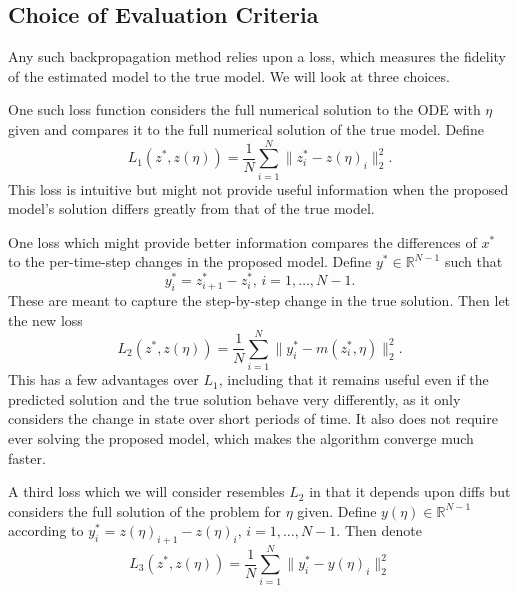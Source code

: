 \documentclass[12pt]{article}
\begin{document}
\subsection{Choice of Evaluation Criteria}\label{norms}

Any such backpropagation method relies upon a loss, which measures the fidelity of the estimated model to the true model. We will look at three choices.

One such loss function considers the full numerical solution to the ODE with $\eta$ given and compares it to the full numerical solution of the true model. Define $$ L_1(z^*, z(\eta)) = \frac{1}{N} \sum_{i=1}^N \|z_i^* - z(\eta)_i\|_2^2.$$ This loss is intuitive but might not provide useful information when the proposed model's solution differs greatly from that of the true model.

One loss which might provide better information compares the differences of $x^*$ to the per-time-step changes in the proposed model. Define $y^* \in \mathbb{R}^{N-1}$ such that $$ y^*_i = z^*_{i+1} - z^*_i,\, i = 1, \ldots , N-1. $$  These are meant to capture the step-by-step change in the true solution. Then let the new loss $$ L_2(z^*, z(\eta)) = \frac{1}{N} \sum_{i=1}^N \| y^*_i - m(z_i^*, \eta) \|^2_2. $$ This has a few advantages over $L_1$, including that it remains useful even if the predicted solution and the true solution behave very differently, as it only considers the change in state over short periods of time. It also does not require ever solving the proposed model, which makes the algorithm converge much faster.

A third loss which we will consider resembles $L_2$ in that it depends upon diffs but considers the full solution of the problem for $\eta$ given. Define $y(\eta) \in \mathbb{R}^{N-1}$ according to $y^*_i = z(\eta)_{i+1} - z(\eta)_i,\, i = 1, \ldots , N-1$. Then denote $$ L_3(z^*, z(\eta)) = \frac{1}{N} \sum_{i=1}^N \|y^*_i - y(\eta)_i\|_2^2 $$


\end{document}
